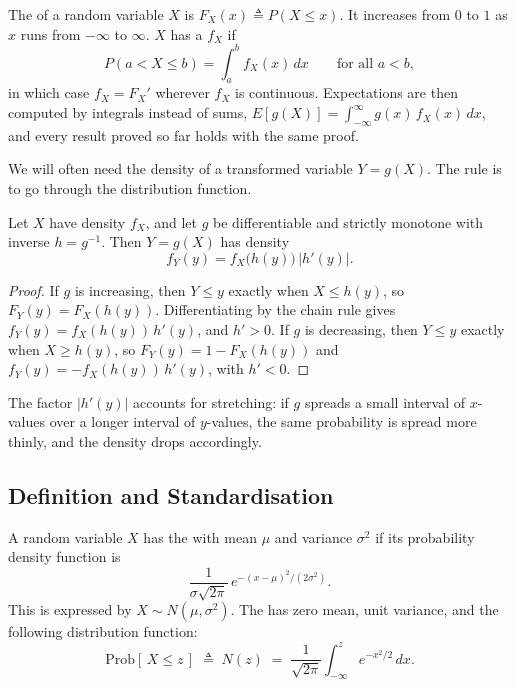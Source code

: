The  of a random variable $X$ is $F_{X}(x)\triangleq P(X\le x)$.
It increases from $0$ to $1$ as $x$ runs from $-\infty$ to $\infty$.
$X$ has a  $f_{X}$ if
\[
	P(a<X\le b) = \int_{a}^{b} f_{X}(x)\,dx
	\qquad\text{for all } a<b ,
\]
in which case $f_{X}=F_{X}'$ wherever $f_{X}$ is continuous.
Expectations are then computed by integrals instead of sums, $E[g(X)]=\int_{-\infty}^{\infty}g(x)\,f_{X}(x)\,dx$, and every result proved so far holds with the same proof.

We will often need the density of a transformed variable $Y=g(X)$.
The rule is to go through the distribution function.

\begin{proposition}\label{prop:change-of-variables}
	Let $X$ have density $f_{X}$, and let $g$ be differentiable and strictly monotone with inverse $h=g^{-1}$.
	Then $Y=g(X)$ has density
	\[
		f_{Y}(y) = f_{X}\bigl(h(y)\bigr)\,\bigl|h'(y)\bigr| .
	\]
\end{proposition}

\begin{proof}
	If $g$ is increasing, then $Y\le y$ exactly when $X\le h(y)$, so $F_{Y}(y)=F_{X}(h(y))$.
	Differentiating by the chain rule gives $f_{Y}(y)=f_{X}(h(y))\,h'(y)$, and $h'>0$.
	If $g$ is decreasing, then $Y\le y$ exactly when $X\ge h(y)$, so $F_{Y}(y)=1-F_{X}(h(y))$ and $f_{Y}(y)=-f_{X}(h(y))\,h'(y)$, with $h'<0$.
\end{proof}

The factor $|h'(y)|$ accounts for stretching: if $g$ spreads a small interval of $x$-values over a longer interval of $y$-values, the same probability is spread more thinly, and the density drops accordingly.
\suppend

\subsection{Definition and Standardisation}


\begin{definition}
	A random variable $X$ has the  with mean $\mu$ and variance $\sigma^{2}$ if its probability density function is
	\begin{equation}
		\frac{1}{\sigma\sqrt{2\pi}}\,e^{-(x-\mu)^{2}/(2\sigma^{2})} . \label{eq:normal-pdf}
	\end{equation}
	This is expressed by $X\sim N(\mu,\sigma^{2})$.
	The  has zero mean, unit variance, and the following distribution function:
	\begin{equation}
		\mathrm{Prob}[\,X\le z\,] \;\triangleq\; N(z) \;=\; \frac{1}{\sqrt{2\pi}}\int_{-\infty}^{z} e^{-x^{2}/2}\,dx . \label{eq:normal-cdf}
	\end{equation}
\end{definition}

